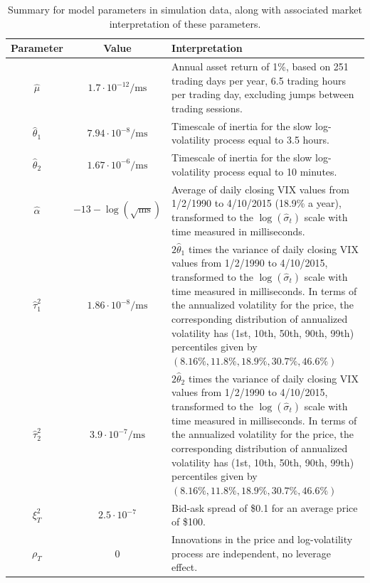 \documentclass[10pt]{article}
\newcommand{\htheta}{\hat{\theta}}
\newcommand{\halpha}{\hat{\alpha}}
\newcommand{\hmu}{\hat{\mu}}
\newcommand{\hsigma}{\hat{\sigma}}
\newcommand{\htau}{\hat{\tau}}
\begin{document}
\begin{table}[h!]
\begin{center}
\begin{tabular}{c!{\color{black}\vrule}c!{\color{black}\vrule}p{8.5cm}}
  Parameter & Value & Interpretation \\ \hline
  $\hmu$ & $1.7 \cdot 10^{-12}/\mbox{ms}$ & Annual asset return of 1\%, based on 251 trading days per year, 6.5 trading hours per trading day, excluding jumps between trading sessions. \\  \hline
  $\htheta_1$ & $7.94 \cdot 10^{-8}/\mbox{ms}$ & Timescale of inertia for the slow log-volatility process equal to 3.5 hours. \\  \hline
  $\htheta_2$ & $1.67 \cdot 10^{-6}/\mbox{ms}$ & Timescale of inertia for the slow log-volatility process equal to 10 minutes. \\  \hline
  $\halpha$ & $-13-\log(\sqrt{\mbox{ms}})$ & Average of daily closing VIX values from 1/2/1990 to 4/10/2015 (18.9\% a year), transformed to the $\log(\hsigma_t)$ scale with time measured in milliseconds. \\  \hline
  $\htau^2_1$ & $1.86 \cdot 10^{-8}/\mbox{ms}$ & $2\htheta_1$ times the variance of daily closing VIX values from 1/2/1990 to 4/10/2015, transformed to the $\log(\hsigma_t)$ scale with time measured in milliseconds. In terms of the annualized volatility for the price, the corresponding distribution of annualized volatility has (1st, 10th, 50th, 90th, 99th) percentiles given by $( 8.16 \%, 11.8\%, 18.9\%, 30.7\%, 46.6\%)$\\  \hline
    $\htau^2_2$ & $3.9 \cdot 10^{-7}/\mbox{ms}$ & $2\htheta_2$ times the variance of daily closing VIX values from 1/2/1990 to 4/10/2015, transformed to the $\log(\hsigma_t)$ scale with time measured in milliseconds. In terms of the annualized volatility for the price, the corresponding distribution of annualized volatility has (1st, 10th, 50th, 90th, 99th) percentiles given by $( 8.16 \%, 11.8\%, 18.9\%, 30.7\%, 46.6\%)$\\  \hline
  $\xi^2_T$ & $2.5 \cdot 10^{-7}$ & Bid-ask spread of \$0.1 for an average price of \$100. \\  \hline
  $\rho_T$ & 0 & Innovations in the price and log-volatility process are independent, no leverage effect.
\end{tabular}
\caption{Summary for model parameters in simulation data, along with associated market interpretation of these parameters.}\label{ta:simulation-parameters}
\end{center}
\end{table}
\end{document}
